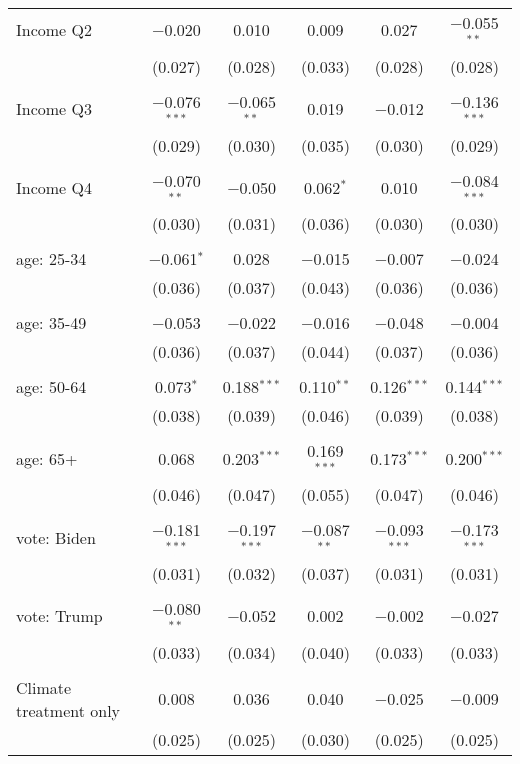 \begin{tabular}{@{\extracolsep{5pt}}lccccc}
 Income Q2 & $-$0.020 & 0.010 & 0.009 & 0.027 & $-$0.055$^{**}$ \\ 
  & (0.027) & (0.028) & (0.033) & (0.028) & (0.028) \\ 
  & & & & & \\ 
 Income Q3 & $-$0.076$^{***}$ & $-$0.065$^{**}$ & 0.019 & $-$0.012 & $-$0.136$^{***}$ \\ 
  & (0.029) & (0.030) & (0.035) & (0.030) & (0.029) \\ 
  & & & & & \\ 
 Income Q4 & $-$0.070$^{**}$ & $-$0.050 & 0.062$^{*}$ & 0.010 & $-$0.084$^{***}$ \\ 
  & (0.030) & (0.031) & (0.036) & (0.030) & (0.030) \\ 
  & & & & & \\ 
 age: 25-34 & $-$0.061$^{*}$ & 0.028 & $-$0.015 & $-$0.007 & $-$0.024 \\ 
  & (0.036) & (0.037) & (0.043) & (0.036) & (0.036) \\ 
  & & & & & \\ 
 age: 35-49 & $-$0.053 & $-$0.022 & $-$0.016 & $-$0.048 & $-$0.004 \\ 
  & (0.036) & (0.037) & (0.044) & (0.037) & (0.036) \\ 
  & & & & & \\ 
 age: 50-64 & 0.073$^{*}$ & 0.188$^{***}$ & 0.110$^{**}$ & 0.126$^{***}$ & 0.144$^{***}$ \\ 
  & (0.038) & (0.039) & (0.046) & (0.039) & (0.038) \\ 
  & & & & & \\ 
 age: 65+ & 0.068 & 0.203$^{***}$ & 0.169$^{***}$ & 0.173$^{***}$ & 0.200$^{***}$ \\ 
  & (0.046) & (0.047) & (0.055) & (0.047) & (0.046) \\ 
  & & & & & \\ 
 vote: Biden & $-$0.181$^{***}$ & $-$0.197$^{***}$ & $-$0.087$^{**}$ & $-$0.093$^{***}$ & $-$0.173$^{***}$ \\ 
  & (0.031) & (0.032) & (0.037) & (0.031) & (0.031) \\ 
  & & & & & \\ 
 vote: Trump & $-$0.080$^{**}$ & $-$0.052 & 0.002 & $-$0.002 & $-$0.027 \\ 
  & (0.033) & (0.034) & (0.040) & (0.033) & (0.033) \\ 
  & & & & & \\ 
 Climate treatment only & 0.008 & 0.036 & 0.040 & $-$0.025 & $-$0.009 \\ 
  & (0.025) & (0.025) & (0.030) & (0.025) & (0.025) \\ 

\end{tabular}
